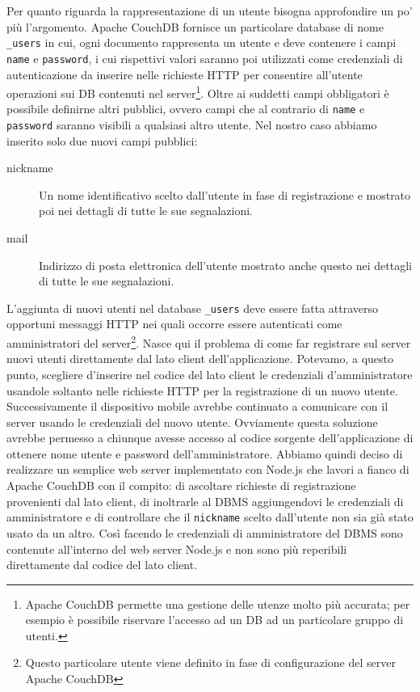 		Per quanto riguarda la rappresentazione di un utente bisogna approfondire
		un po' più l'argomento. Apache CouchDB\texttrademark{} fornisce un
		particolare database di nome \verb|_users| in cui, ogni documento 
		rappresenta un utente e deve contenere i campi \texttt{name} e \texttt{password}, i cui
		rispettivi valori saranno poi utilizzati come credenziali di
		autenticazione da inserire nelle richieste HTTP per consentire
		all'utente operazioni sui DB contenuti nel server\footnote{
		Apache CouchDB\texttrademark{} permette una gestione delle utenze molto
		più accurata; per esempio è possibile riservare l'accesso ad un DB ad un
		particolare gruppo di utenti.}. Oltre ai suddetti campi obbligatori è
		possibile definirne altri pubblici, ovvero campi che al contrario di
		\texttt{name} e \texttt{password} saranno visibili a qualsiasi altro utente.
		Nel nostro caso abbiamo inserito solo due nuovi campi pubblici:
		\begin{description}
			\item[nickname] Un nome identificativo scelto dall'utente in fase di
				registrazione e mostrato poi nei dettagli di tutte le sue segnalazioni.
			\item[mail] Indirizzo di posta elettronica dell'utente mostrato anche questo
				nei dettagli di tutte le sue segnalazioni.
		\end{description}
		
		L'aggiunta di nuovi utenti nel database \verb|_users| deve essere fatta
		attraverso opportuni messaggi HTTP nei quali occorre essere autenticati
		come amministratori del server\footnote{Questo particolare utente viene
		definito in fase di configurazione del server Apache CouchDB\texttrademark{}}.
		Nasce qui il problema di come far registrare sul server nuovi utenti
		direttamente dal lato client dell'applicazione. Potevamo, a questo punto,
		scegliere d'inserire nel codice del lato client le credenziali
		d'amministratore usandole soltanto nelle richieste HTTP per la registrazione
		di un nuovo utente.	Successivamente il dispositivo mobile avrebbe continuato a
		comunicare con il server usando le credenziali del nuovo utente. Ovviamente
		questa soluzione avrebbe permesso a chiunque avesse accesso al codice
		sorgente dell'applicazione di ottenere nome utente e password dell'amministratore.
		Abbiamo quindi deciso di realizzare un semplice web server implementato
		con Node.js che lavori a fianco di Apache CouchDB\texttrademark{} con il
		compito: di ascoltare richieste di registrazione provenienti dal lato
		client, di inoltrarle al DBMS aggiungendovi le credenziali di amministratore
		e di controllare che il \texttt{nickname} scelto dall'utente non sia già
		stato usato da un altro. Così facendo le credenziali di amministratore
		del DBMS sono contenute all'interno del web server Node.js e non sono più
		reperibili direttamente dal codice del lato client. 
		
